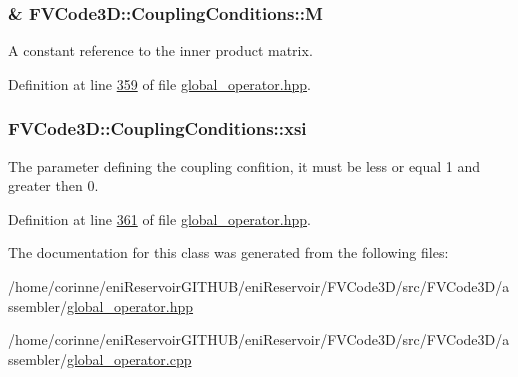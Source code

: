 \subsubsection[{\texorpdfstring{M}{M}}]{\& F\+V\+Code3\+D\+::\+Coupling\+Conditions\+::M\hspace{0.3cm}{\ttfamily [private]}}\hypertarget{classFVCode3D_1_1CouplingConditions_a6aff06f6efb2dbd28fe17bc6c1c03ce9}{}\label{classFVCode3D_1_1CouplingConditions_a6aff06f6efb2dbd28fe17bc6c1c03ce9}


A constant reference to the inner product matrix. 



Definition at line \hyperlink{global__operator_8hpp_source_l00359}{359} of file \hyperlink{global__operator_8hpp_source}{global\+\_\+operator.\+hpp}.

\subsubsection[{\texorpdfstring{xsi}{xsi}}]{ F\+V\+Code3\+D\+::\+Coupling\+Conditions\+::xsi\hspace{0.3cm}{\ttfamily [private]}}\hypertarget{classFVCode3D_1_1CouplingConditions_a03825be63a95a269b19a80d079d58f12}{}\label{classFVCode3D_1_1CouplingConditions_a03825be63a95a269b19a80d079d58f12}


The parameter defining the coupling confition, it must be less or equal 1 and greater then 0. 



Definition at line \hyperlink{global__operator_8hpp_source_l00361}{361} of file \hyperlink{global__operator_8hpp_source}{global\+\_\+operator.\+hpp}.



The documentation for this class was generated from the following files\+:\begin{DoxyCompactItemize}
\item 
/home/corinne/eni\+Reservoir\+G\+I\+T\+H\+U\+B/eni\+Reservoir/\+F\+V\+Code3\+D/src/\+F\+V\+Code3\+D/assembler/\hyperlink{global__operator_8hpp}{global\+\_\+operator.\+hpp}\item 
/home/corinne/eni\+Reservoir\+G\+I\+T\+H\+U\+B/eni\+Reservoir/\+F\+V\+Code3\+D/src/\+F\+V\+Code3\+D/assembler/\hyperlink{global__operator_8cpp}{global\+\_\+operator.\+cpp}\end{DoxyCompactItemize}
